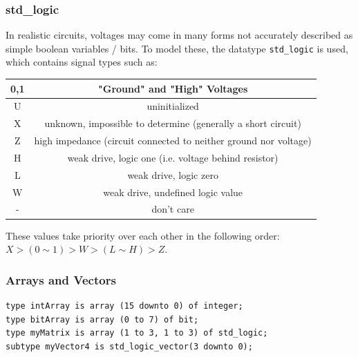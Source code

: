 \documentclass{report}
\newcommand*{\newpar}{\par\vspace{\baselineskip}\noindent} %
\begin{document}
\subsubsection{std\_logic}
In realistic circuits, voltages may come in many forms not accurately described as simple boolean variables / bits. To model these, the datatype \texttt{std\_logic} is used, which contains signal types such as:
\newpar
\begin{tabular}{|c|c|}
    \hline
    0,1 & "Ground" and "High" Voltages\\\hline
    U & uninitialized\\\hline
    X & unknown, impossible to determine (generally a short circuit)\\\hline
    Z & high impedance (circuit connected to neither ground nor voltage)\\\hline
    H & weak drive, logic one (i.e. voltage behind resistor)\\\hline
    L & weak drive, logic zero\\\hline
    W & weak drive, undefined logic value\\\hline 
    - & don't care\\\hline
\end{tabular}
\newpar
These values take priority over each other in the following order: $X > (0 \sim 1) > W > (L \sim H) > Z$.
\newpar
\subsubsection{Arrays and Vectors}
\begin{verbatim}
type intArray is array (15 downto 0) of integer;
type bitArray is array (0 to 7) of bit;
type myMatrix is array (1 to 3, 1 to 3) of std_logic;
subtype myVector4 is std_logic_vector(3 downto 0);
\end{verbatim}
\end{document}
